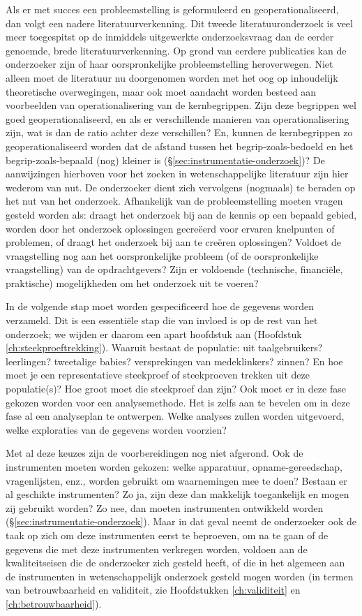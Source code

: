\documentclass[
]{book}
\begin{document}
Als er met succes een probleemstelling is geformuleerd en
geoperationaliseerd, dan volgt een nadere literatuurverkenning. Dit
tweede literatuuronderzoek is veel meer toegespitst op de inmiddels
uitgewerkte onderzoeksvraag dan de eerder genoemde, brede
literatuurverkenning. Op grond van eerdere publicaties kan de
onderzoeker zijn of haar oorspronkelijke probleemstelling heroverwegen.
Niet alleen moet de literatuur nu doorgenomen worden met het oog op
inhoudelijk theoretische overwegingen, maar ook moet aandacht worden
besteed aan voorbeelden van operationalisering van de kernbegrippen.
Zijn deze begrippen wel goed geoperationaliseerd, en als er
verschillende manieren van operationalisering zijn, wat is dan de ratio
achter deze verschillen? En, kunnen de kernbegrippen zo
geoperationaliseerd worden dat de afstand tussen het
begrip-zoals-bedoeld en het begrip-zoals-bepaald (nog) kleiner is
(§\ref{sec:instrumentatie-onderzoek})? De aanwijzingen hierboven
voor het zoeken in wetenschappelijke literatuur zijn hier wederom van
nut. De onderzoeker dient zich vervolgens (nogmaals) te beraden op het
nut van het onderzoek. Afhankelijk van de probleemstelling moeten vragen
gesteld worden als: draagt het onderzoek bij aan de kennis op een
bepaald gebied, worden door het onderzoek oplossingen gecreëerd voor
ervaren knelpunten of problemen, of draagt het onderzoek bij aan te
creëren oplossingen? Voldoet de vraagstelling nog aan het
oorspronkelijke probleem (of de oorspronkelijke vraagstelling) van de
opdrachtgevers? Zijn er voldoende (technische, financiële, praktische)
mogelijkheden om het onderzoek uit te voeren?

In de volgende stap moet worden gespecificeerd hoe de gegevens worden
verzameld. Dit is een essentiële stap die van invloed is op de rest van
het onderzoek; we wijden er daarom een apart hoofdstuk aan
(Hoofdstuk \ref{ch:steekproeftrekking}).
Waaruit bestaat de populatie: uit
taalgebruikers? leerlingen? tweetalige babies? versprekingen van
medeklinkers? zinnen? En hoe moet je een representatieve steekproef of
steekproeven trekken uit deze populatie(s)? Hoe groot moet die
steekproef dan zijn? Ook moet er in deze fase gekozen worden voor een
analysemethode. Het is zelfs aan te bevelen om in deze fase al een
analyseplan te ontwerpen. Welke analyses zullen worden uitgevoerd, welke exploraties van de gegevens worden voorzien?

Met al deze keuzes zijn de voorbereidingen nog niet afgerond. Ook de
instrumenten moeten worden gekozen: welke apparatuur,
opname-gereedschap, vragenlijsten, enz., worden gebruikt om waarnemingen
mee te doen? Bestaan er al geschikte instrumenten? Zo ja, zijn deze dan
makkelijk toegankelijk en mogen zij gebruikt worden? Zo nee, dan moeten
instrumenten ontwikkeld worden
(§\ref{sec:instrumentatie-onderzoek}).
Maar in dat geval neemt de
onderzoeker ook de taak op zich om deze instrumenten eerst te beproeven,
om na te gaan of de gegevens die met deze instrumenten verkregen worden,
voldoen aan de kwaliteitseisen die de onderzoeker zich gesteld heeft, of
die in het algemeen aan de instrumenten in wetenschappelijk onderzoek
gesteld mogen worden (in termen van betrouwbaarheid en validiteit, zie
Hoofdstukken \ref{ch:validiteit} en \ref{ch:betrouwbaarheid}).
\end{document}
